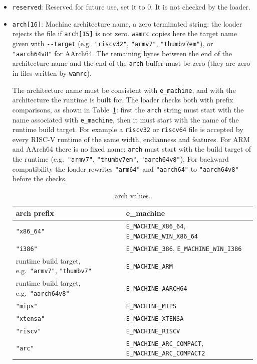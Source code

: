 \documentclass{article}
\begin{document}
\begin{itemize}
    \item \verb|reserved|:
        Reserved for future use, set it to 0. It is not checked by the loader.

    \item \verb|arch[16]|:
        Machine architecture name, a zero terminated string: the loader rejects the file if \verb|arch[15]| is not zero.
        \texttt{wamrc} copies here the target name given with \verb|--target| (e.g.\ \verb|"riscv32"|, \verb|"armv7"|, \verb|"thumbv7em"|), or \verb|"aarch64v8"| for AArch64.
        The remaining bytes between the end of the architecture name and the end of the \verb|arch| buffer must be zero (they are zero in files written by \texttt{wamrc}).

        The architecture name must be consistent with \verb|e_machine|, and with the architecture the runtime is built for.
        The loader checks both with prefix comparisons, as shown in Table~\ref{table:arch-legal-values}:
        first the \verb|arch| string must start with the name associated with \verb|e_machine|, then it must start with the name of the runtime build target.
        For example a \texttt{riscv32} or \texttt{riscv64} file is accepted by every RISC-V runtime of the same width, endianness and features.
        For ARM and AArch64 there is no fixed name: \verb|arch| must start with the build target of the runtime (e.g.\ \verb|"armv7"|, \verb|"thumbv7em"|, \verb|"aarch64v8"|).
        For backward compatibility the loader rewrites \verb|"arm64"| and \verb|"aarch64"| to \verb|"aarch64v8"| before the checks.

        \begin{table}[H]
        \centering
        \begin{tabular}{p{5.4cm}p{6.4cm}}
            \hline
            arch prefix & e\_machine \\
            \hline
            \verb|"x86_64"| & \verb|E_MACHINE_X86_64|, \verb|E_MACHINE_WIN_X86_64| \\
            \verb|"i386"|   & \verb|E_MACHINE_386|, \verb|E_MACHINE_WIN_I386| \\
            runtime build target, e.g.\ \verb|"armv7"|, \verb|"thumbv7"| & \verb|E_MACHINE_ARM| \\
            runtime build target, e.g.\ \verb|"aarch64v8"| & \verb|E_MACHINE_AARCH64| \\
            \verb|"mips"|   & \verb|E_MACHINE_MIPS| \\
            \verb|"xtensa"| & \verb|E_MACHINE_XTENSA| \\
            \verb|"riscv"|  & \verb|E_MACHINE_RISCV|\\
            \verb|"arc"|    & \verb|E_MACHINE_ARC_COMPACT|, \verb|E_MACHINE_ARC_COMPACT2| \\
            \hline
        \end{tabular}
        \caption{arch values.}
        \label{table:arch-legal-values}
        \end{table}

\end{itemize}
\end{document}
